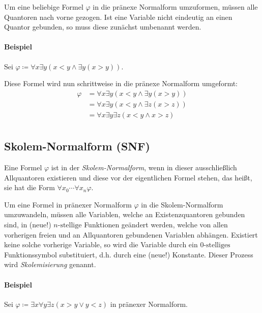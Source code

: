 \documentclass[a4paper, 11pt, accentcolor = tud3b]{tudreport}
\begin{document}
                Um eine beliebige Formel $ \varphi $ in die pränexe Normalform umzuformen, müssen alle Quantoren nach vorne gezogen. Ist eine Variable nicht eindeutig an einen Quantor gebunden, so muss diese zunächst umbenannt werden.

                \paragraph{Beispiel}
                    Sei $ \varphi \coloneqq \forall x \exists y (x < y \land \exists y (x > y)) $.

                    Diese Formel wird nun schrittweise in die pränexe Normalform umgeformt:
                    \begin{align*}
                        \varphi &= \forall x \exists y (x < y \land \exists y (x > y)) \tag{Umbenennung} \\
                                &= \forall x \exists y (x < y \land \exists z (x > z)) \tag{Quantoren-Verschiebung} \\
                                &= \forall x \exists y \exists z (x < y \land x > z) \tag{Pränexe Normalform} \\
                    \end{align*}

            \subsection{Skolem-Normalform (SNF)}
                Eine Formel $ \varphi $ ist in der \textit{Skolem-Normalform}, wenn in dieser ausschließlich Allquantoren existieren und diese vor der eigentlichen Formel stehen, das heißt, sie hat die Form $ \forall x _ 0 \cdots \forall x _ n \varphi $.

                Um eine Formel in pränexer Normalform $ \varphi $ in die Skolem-Normalform umzuwandeln, müssen alle Variablen, welche an Existenzquantoren gebunden sind, in (neue!) $ n\text{-stellige} $ Funktionen geändert werden, welche von allen vorherigen freien und an Allquantoren gebundenen Variablen abhängen. Existiert keine solche vorherige Variable, so wird die Variable durch ein $ 0\text{-stelliges} $ Funktionssymbol substituiert, d.h. durch eine (neue!) Konstante. Dieser Prozess wird \textit{Skolemisierung} genannt.

                \paragraph{Beispiel}
                    Sei $ \varphi \coloneqq \exists x \forall y \exists z (x > y \lor y < z) $ in pränexer Normalform.
\end{document}
